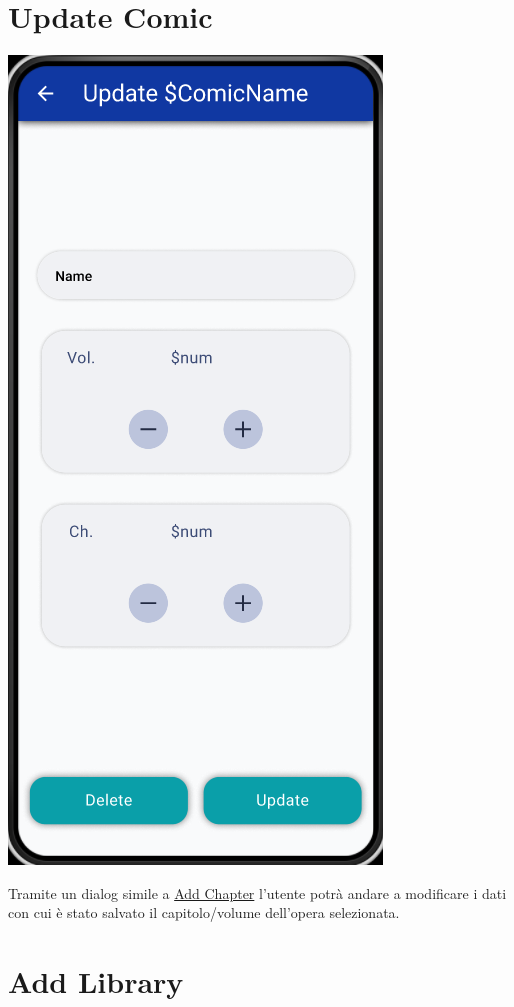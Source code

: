 \documentclass{report}
\begin{document}
\section{Update Comic}\label{sec:update_comic}

\begin{center}
  \includegraphics[scale=0.4]{update_library.png}
\end{center}

Tramite un dialog simile a \hyperref[sec:add_chapter]{Add Chapter} l'utente potrà andare a modificare i dati con cui è stato salvato il capitolo/volume dell'opera selezionata.

\section{Add Library}\label{sec:add_library}
\end{document}
